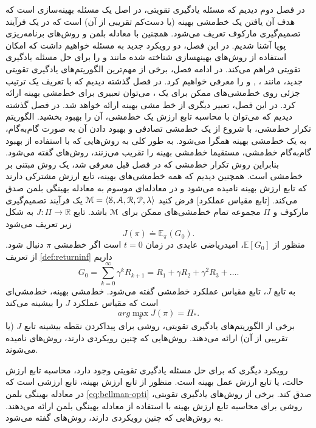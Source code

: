 
در فصل دوم دیدیم که مسئله یادگیری تقویتی، در اصل یک مسئله بهینه‌سازی است که هدف آن یافتن یک خط‌مشی بهینه (یا دست‌کم تقریبی از آن) است که در یک فرآیند تصمیم‌گیری مارکوف تعریف می‌شود. همچنین  با معادله بلمن و روش‌های برنامه‌ریزی پویا آشنا شدیم. در این فصل، دو رویکرد جدید به مسئله خواهیم داشت که امکان استفاده از روش‌های بهینه\nf سازی شناخته شده مانند 
\textit{}
و
\textit{}
را برای حل مسئله یادگیری تقویتی فراهم می‌کند. در ادامه فصل، برخی از مهم‌ترین الگوریتم‌های یادگیری تقویتی جدید، مانند
،
,
 و 
  را معرفی خواهیم کرد. 
 در فصل گذشته  دیدیم که با تعریف یک ترتیب جزئی روی خط‌مشی‌های ممکن برای یک
،
می‌توان تعبیری برای خط‌مشی بهینه ارائه کرد. در این فصل، تعبیر دیگری از خط مشی بهینه ارائه خواهد شد.  در فصل گذشته دیدیم که می‌توان با محاسبه تابع ارزش یک خط‌مشی، آن را بهبود بخشید. الگوریتم تکرار خط‌مشی، با شروع از یک خط‌مشی تصادفی و بهبود دادن آن به صورت گام‌به‌گام، به یک خط‌مشی بهینه همگرا می‌شود.  به طور کلی به روش‌هایی که با استفاده از بهبود گام‌به‌گام خط‌مشی، مستقیما خط‌مشی بهینه  را تقریب می‌زنند، روش‌های 
\textit{}
گفته می‌شود. بنابراین روش تکرار خط‌مشی که در فصل قبل معرفی شد، یک روش مبتنی بر خط‌مشی است.
 همچنین دیدیم که همه خط‌مشی‌های بهینه، تابع ارزش مشترکی دارند که تابع ارزش بهینه نامیده  می‌شود و در معادله‌ای موسوم به معادله بهینگی بلمن صدق می‌کند.
[تابع مقیاس عملکرد] فرض کنید 
$\EuScript{M} = \left< \EuScript{S},\EuScript{A},\EuScript{R},\EuScript{P}, \lambda \right>$ 
یک فرآیند تصمیم‌گیری مارکوف و $\Pi$ مجموعه تمام خط‌مشی‌های ممکن برای $\EuScript{M}$ باشد. تابع 
$J: \Pi \to \mathbb{R}$
به شکل زیر تعریف می‌شود
$$J(\pi) \doteq \mathbb{E}_\pi(G_0).$$
منظور از 
$\mathbb{E}[G_0]$،
امیدریاضی عایدی در زمان 
$t=0$
است اگر خط‌مشی $\pi$ دنبال شود. از تعریف 
\ref{def:returninf}
داریم
$$G_0 = \sum_{k=0}^{\infty} \gamma^{k} R_{k+1} = R_1 + \gamma R_2 + \gamma^2 R_3 + \dots .$$
به تابع $J$، تابع مقیاس عملکرد خط‌مشی گفته می‌شود.
خط‌مشی بهینه، خط‌مشی‌ای است که مقیاس عملکرد $J$ را بیشینه می‌کند
$$arg \max_{\pi} J(\pi) = \Pi_*.$$
برخی از الگوریتم‌های یادگیری تقویتی، روشی برای پیداکردن نقطه بیشینه تابع $J$ (یا تقریبی از آن) ارائه می‌دهند. روش‌هایی که چنین رویکردی دارند، روش‌های 
\textit{}
 نامیده می‌شوند.
 
 رویکرد دیگری که برای حل مسئله یادگیری تقویتی وجود دارد، محاسبه تابع ارزش حالت، یا تابع ارزش عمل بهینه است. منظور از تابع ارزش بهینه، تابع ارزشی است که در معادله بهینگی بلمن 
 \ref{eq:bellman-opti}
 صدق کند. برخی از روش‌های یادگیری تقویتی، روشی برای محاسبه تابع ارزش بهینه با استفاده از معادله بهینگی بلمن ارائه می‌دهند. به روش‌هایی که چنین رویکردی دارند، روش‌های 
 \textit{
 	}
 گفته می‌شود.

